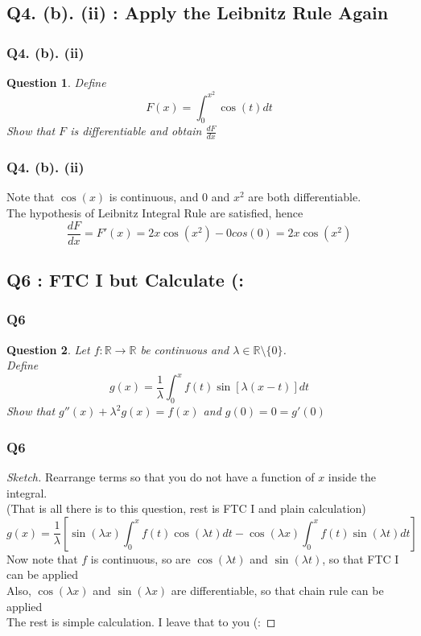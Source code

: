 \documentclass[aspectratio=169]{beamer}
\renewcommand\qedsymbol{$\blacksquare$}
\newtheorem{qsn}{Question}
\newcommand{\bR}{\mathbb{R}}
\begin{document}
\subsection{Q4. (b). (ii) : Apply the Leibnitz Rule Again}

\begin{frame}
\frametitle{Q4. (b). (ii)}
\pause
\begin{qsn}
Define
$$F(x) = \int_{0}^{x^2} \cos(t) dt$$
Show that $F$ is differentiable and obtain $\displaystyle{\frac{dF}{dx}}$
\end{qsn}
\end{frame}

\begin{frame}
\pause
\frametitle{Q4. (b). (ii)}
Note that $\cos(x)$ is continuous, and $0$ and $x^2$ are both differentiable.\\[1mm]\pause
The hypothesis of Leibnitz Integral Rule are satisfied, hence 
$$\frac{dF}{dx} = F'(x) = 2x\cos(x^2) - 0cos(0) = 2x\cos(x^2)$$
\end{frame}

\subsection{Q6 : FTC I but Calculate (:}

\begin{frame}
\frametitle{Q6}
\pause
\begin{qsn}
Let $f:\bR \to \bR$ be continuous and $\lambda \in \bR \setminus \{0\}$.\\ \pause
Define
$$g(x) = \frac{1}{\lambda} \int_0^x f(t) \sin[\lambda(x-t)]dt$$ \pause
Show that $g''(x) + \lambda^2 g(x) = f(x)$ and $g(0) = 0 = g'(0)$
\end{qsn}
\end{frame}

\begin{frame}
\frametitle{Q6}
\begin{proof}[Sketch]
\renewcommand{\qedsymbol}{}
\pause
Rearrange terms so that you do not have a function of $x$ inside the integral.\\ \pause
(That is all there is to this question, rest is FTC I and plain calculation) \pause
$$g(x) = \frac{1}{\lambda}\left[\sin(\lambda x)\int_0^x f(t)\cos(\lambda t)dt - \cos(\lambda x)\int_0^x f(t)\sin(\lambda t)dt\right]$$ \pause
Now note that $f$ is continuous, so are $\cos(\lambda t)$ and $\sin(\lambda t)$, so that FTC I can be applied\\ \pause
Also, $\cos(\lambda x)$ and $\sin(\lambda x)$ are differentiable, so that chain rule can be applied\\ \pause
The rest is simple calculation. I leave that to you (:
\end{proof}
\end{frame}
\end{document}
